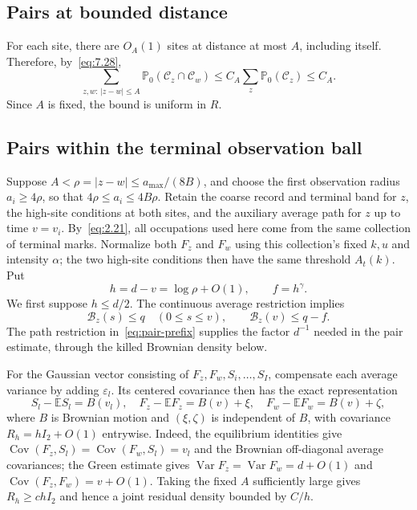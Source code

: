 \documentclass[11pt,letterpaper,reqno]{amsart}
\numberwithin{equation}{section}
\theoremstyle{remark}
\DeclareMathOperator{\Var}{Var}
\DeclareMathOperator{\Cov}{Cov}
\begin{document}
\subsection{Pairs at bounded distance}\label{sec:neighbors}
For each site, there are $O_A(1)$ sites at distance at most $A$, including itself. Therefore, by~\eqref{eq:7.28},
\begin{equation}\label{eq:9.1}
\sum_{z,w:\,|z-w|\le A}
\mathbb P_0(\mathcal C_z\cap\mathcal C_w)
\le C_A\sum_z\mathbb P_0(\mathcal C_z)\le C_A.
\end{equation}
Since $A$ is fixed, the bound is uniform in $R$.

\subsection{Pairs within the terminal observation ball}\label{sec:latepairs}
Suppose $A<\rho=|z-w|\le a_{\max}/(8B)$, and choose the first observation radius $a_i\ge4\rho$, so that $4\rho\le a_i\le4B\rho$. Retain the coarse record and terminal band for $z$, the high-site conditions at both sites, and the auxiliary average path for $z$ up to time $v=v_i$. By~\eqref{eq:2.21}, all occupations used here come from the same collection of terminal marks. Normalize both $F_z$ and $F_w$ using this collection's fixed $k,u$ and intensity $\alpha$; the two high-site conditions then have the same threshold $A_t(k)$. Put
\[
 h=d-v=\log\rho+O(1),\qquad f=h^\gamma.
\]
We first suppose $h\le d/2$. The continuous average restriction implies
\begin{equation}\label{eq:pair-prefix}
 \mathcal B_z(s)\le q\quad(0\le s\le v),\qquad
 \mathcal B_z(v)\le q-f.
\end{equation}
The path restriction in~\eqref{eq:pair-prefix} supplies the factor $d^{-1}$ needed in the pair estimate, through the killed Brownian density below.

For the Gaussian vector consisting of $F_z,F_w,S_i,\ldots,S_I$, compensate each average variance by adding $\varepsilon_l$. Its centered covariance then has the exact representation
\begin{equation}\label{eq:pair-brownian}
 S_l-\mathbb ES_l=B(v_l),\quad
 F_z-\mathbb EF_z=B(v)+\xi,\quad
 F_w-\mathbb EF_w=B(v)+\zeta,
\end{equation}
where $B$ is Brownian motion and $(\xi,\zeta)$ is independent of $B$, with covariance $R_h=hI_2+O(1)$ entrywise. Indeed, the equilibrium identities give $\Cov(F_z,S_l)=\Cov(F_w,S_l)=v_l$ and the Brownian off-diagonal average covariances; the Green estimate gives $\Var F_z=\Var F_w=d+O(1)$ and $\Cov(F_z,F_w)=v+O(1)$. Taking the fixed $A$ sufficiently large gives $R_h\ge chI_2$ and hence a joint residual density bounded by $C/h$.
\end{document}
